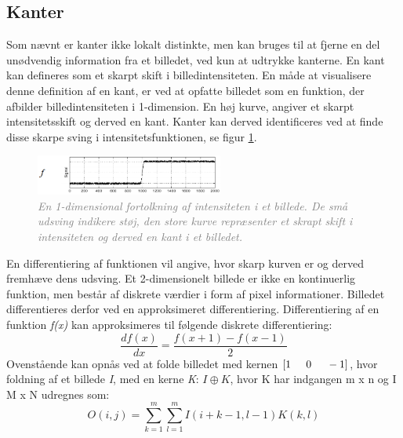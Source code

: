 \subsection{Kanter}\label{subsec:kant}
Som nævnt er kanter ikke lokalt distinkte, men kan bruges til at fjerne en del unødvendig information fra et billedet, ved kun at udtrykke kanterne.  En kant kan defineres som et skarpt skift i billedintensiteten. 
En måde at visualisere denne definition af en kant, er ved at opfatte billedet som en funktion, der afbilder billedintensiteten i 1-dimension. En høj kurve, angiver et skarpt intensitetsskift og derved en kant. Kanter kan derved identificeres ved at finde disse skarpe sving i intensitetsfunktionen, se figur \ref{fig:kant}.
\noindent
\begin{figure}[H]
    \centering
    \includegraphics[width=0.55\textwidth]{fig/7.png}
     \vspace{-1em}
    \begin{center}        
     \caption{\textcolor{gray}{\footnotesize \textit{
     En 1-dimensional fortolkning af intensiteten i et billede. De små udsving indikere støj, den store kurve repræsenter et skrapt skift i intensiteten og derved en kant i et billedet.}}}
    \label{fig:kant}
     \end{center}
       \vspace{-2.5em}
  \end{figure}
\noindent
En differentiering af funktionen vil angive, hvor skarp kurven er og derved fremhæve dens udsving. Et 2-dimensionelt billede er ikke en kontinuerlig funktion, men består af diskrete værdier i form af pixel informationer.
Billedet differentieres derfor ved en approksimeret differentiering. Differentiering af en funktion \emph{f(x)} kan approksimeres til følgende diskrete differentiering:
\begin{equation}
\dfrac{df(x)}{dx}=\dfrac{f(x+1)-f(x-1)}{2}
\label{diff}
\end{equation}
Ovenstående kan opnås ved at folde billedet med kernen $[1 \hspace{0.5cm} 0 \hspace{0.5cm} -1]$, hvor foldning af et billede \emph{I}, med en kerne \emph{K}: $I\oplus K$, hvor K har indgangen m x n og I M x N udregnes som:
\begin{equation}
O(i,j) = \sum\limits_{k=1}^m \sum\limits_{l=1}^m I(i+k-1,l-1)K(k,l)
\end{equation}
